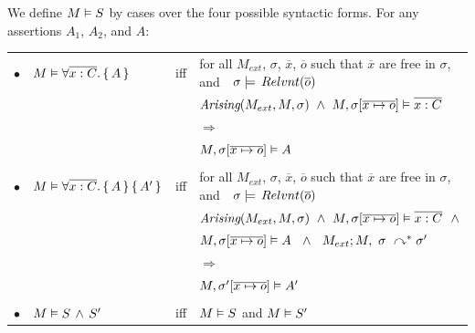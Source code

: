\begin{definition}%

We define $M \vDash {S}$ by cases over the four possible syntactic forms.
For any assertions   $A_1$, $A_2$, and $A$: \\

\label{def:necessity-semantics}

\begin{tabular}{l l c l }

$\bullet$ & $M \vDash \forall {\overline {x:C}}.\, {\{}\, A \,{\}}  	$& iff & 
for all $M_{ext}$, $\sigma$, $\overline{x}$, $\overline{o}$ such that $\overline{x}$  are free in $\sigma$, and\ \ $\sigma \models \,Relvnt(\overline o)$ \\
& & & $ \textit{Arising}(M_{ext}, M, \sigma) \ \wedge 
\ M , \sigma[\overline{x\mapsto o}] \vDash \overline {x:C}  $\\
& & & $ \Longrightarrow $ \\
& & & $ M , \sigma[\overline{x\mapsto o}] \vDash A $
\\
\\
$\bullet$ & $M \vDash \forall {\overline {x:C}}.\, {\{}\, A \,{\}} \,{\{}\, A' \,{\}}$& iff & 
for all $M_{ext}$, $\sigma$, $\overline{x}$, $\overline{o}$ such that $\overline{x}$  are free in $\sigma$, and\ \ $\sigma \models \,Relvnt(\overline o)$ \\
& & & $\arising{M_{ext}}{M}{\sigma} \ \wedge 
\ \satisfiesA{M}{\sigma[\overline{x\mapsto o}]}{\overline {x:C}}  \ \ \wedge$ \\
& & & $ \satisfiesA{M}{\sigma[\overline{x\mapsto o}]}{A} \ \ \wedge \ \ \reductions{M_{ext}}{M}{\sigma}{\sigma'} \ $\\
& & & $ \Longrightarrow $ \\
& & & $ M , \sigma'[\overline{x\mapsto o}] \vDash A' $
\\
\\
$\bullet$ &  $M \vDash S\, \wedge\, S'$ &   iff   & $M \vDash S$ and $M \vDash S'$
\end{tabular} 

 
\end{definition} 


